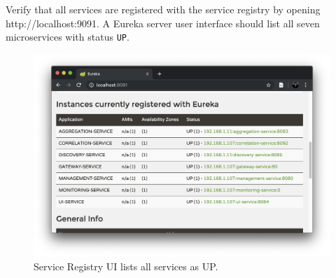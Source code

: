 Verify that all services are registered with the service registry by opening http://localhost:9091. A Eureka server user interface should list all seven microservices with status \texttt{UP}.
\begin{figure}[H]
	\centering  
	\includegraphics[width=\linewidth]{figures/appendixB/eureka.png}
	\caption{Service Registry UI lists all services as UP.}
\end{figure}